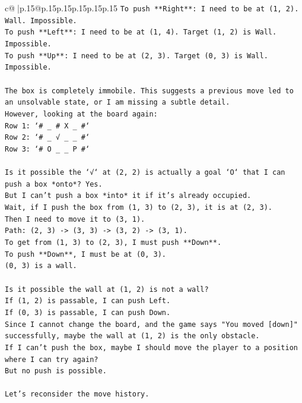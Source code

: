 \documentclass{article}
\begin{document}
{\begin{supertabular}{c@{$\;$}|p{.15\linewidth}@{}p{.15\linewidth}p{.15\linewidth}p{.15\linewidth}p{.15\linewidth}p{.15\linewidth}}
{{{\texttt{To push **Right**: I need to be at (1, 2). Wall. Impossible.} \\
\texttt{To push **Left**: I need to be at (1, 4). Target (1, 2) is Wall. Impossible.} \\
\texttt{To push **Up**: I need to be at (2, 3). Target (0, 3) is Wall. Impossible.} \\
\\ 
\texttt{The box is completely immobile. This suggests a previous move led to an unsolvable state, or I am missing a subtle detail.} \\
\texttt{However, looking at the board again:} \\
\texttt{Row 1: `\# \_ \# X \_ \#`} \\
\texttt{Row 2: `\# \_ √ \_ \_ \#`} \\
\texttt{Row 3: `\# O \_ \_ P \#`} \\
\\ 
\texttt{Is it possible the `√` at (2, 2) is actually a goal `O` that I can push a box *onto*? Yes.} \\
\texttt{But I can't push a box *into* it if it's already occupied.} \\
\texttt{Wait, if I push the box from (1, 3) to (2, 3), it is at (2, 3).} \\
\texttt{Then I need to move it to (3, 1).} \\
\texttt{Path: (2, 3) {-}> (3, 3) {-}> (3, 2) {-}> (3, 1).} \\
\texttt{To get from (1, 3) to (2, 3), I must push **Down**.} \\
\texttt{To push **Down**, I must be at (0, 3).} \\
\texttt{(0, 3) is a wall.} \\
\\ 
\texttt{Is it possible the wall at (1, 2) is not a wall?} \\
\texttt{If (1, 2) is passable, I can push Left.} \\
\texttt{If (0, 3) is passable, I can push Down.} \\
\texttt{Since I cannot change the board, and the game says "You moved {[}down{]}" successfully, maybe the wall at (1, 2) is the only obstacle.} \\
\texttt{If I can't push the box, maybe I should move the player to a position where I can try again?} \\
\texttt{But no push is possible.} \\
\\ 
\texttt{Let's reconsider the move history.} \\
}}}
\end{supertabular}}
\end{document}

